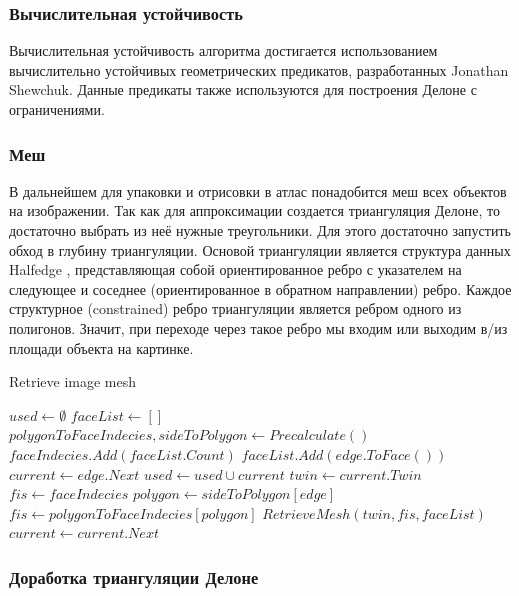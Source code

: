\documentclass{fefu_thesis/cls/fefu}
\newenvironment{algo}[1][]
  {\begin{algorithm}[#1]
     \selectlanguage{english}
     \floatname{algorithm}{Алгоритм}
  }
  {\end{algorithm}}
\begin{document}
    \subsubsection{Вычислительная устойчивость}
    Вычислительная устойчивость алгоритма достигается использованием вычислительно устойчивых геометрических предикатов, разработанных Jonathan Shewchuk\cite{shewchuk97a}. Данные предикаты также используются для построения Делоне с ограничениями.
    \subsubsection{Меш}
    В дальнейшем для упаковки и отрисовки в атлас понадобится меш всех объектов на изображении. Так как для аппроксимации создается триангуляция Делоне, то достаточно выбрать из неё нужные треугольники. Для этого достаточно запустить обход в глубину триангуляции. Основой триангуляции является структура данных Halfedge \cite{Halfedge}, представляющая собой ориентированное ребро с указателем на следующее и соседнее (ориентированное в обратном направлении) ребро. Каждое структурное (constrained) ребро триангуляции является ребром одного из полигонов. Значит, при переходе через такое ребро мы входим или выходим в/из площади объекта на картинке.

    \begin{algo}[H]
        \caption{Retrieve image mesh}
        \begin{algorithmic}[1]
            \State $used \gets \emptyset$
            \State $faceList \gets []$
            \State $polygonToFaceIndecies, sideToPolygon \gets Precalculate()$
                 
                    \State $faceIndecies.Add(faceList.Count)$
                    \State $faceList.Add(edge.ToFace())$
                    \State $current \gets edge.Next$
                            \State $used \gets used \cup current$
                            \State $twin \gets current.Twin$
                            \State $fis \gets faceIndecies$
                                \State $polygon \gets sideToPolygon[edge]$ 
                                \State $fis \gets polygonToFaceIndecies[polygon]$
                            \EndIf
                            \State $RetrieveMesh(twin, fis, faceList)$
                        \EndIf
                    \EndWhile
                \EndIf
                \State $current \gets current.Next$
            \EndProcedure
        \end{algorithmic}
    \end{algo}

    \subsubsection{Доработка триангуляции Делоне}
    \cite{DelaunayRemove}\cite{LinearDelaunay}
    \newpage
    
    
\end{document}
